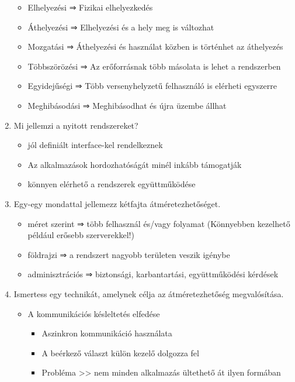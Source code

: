 \documentclass[twoside, a4paper, 12pt]{article}
\begin{document}
\begin{enumerate}
\begin{itemize}
            \item Elhelyezési ⇒ Fizikai elhelyezkedés
            \item Áthelyezési ⇒ Elhelyezési és a hely meg is változhat
            \item Mozgatási ⇒ Áthelyezési és használat közben is történhet az áthelyezés
            \item Többszörözési ⇒ Az erőforrásnak több másolata is lehet a rendszerben
            \item Egyidejűségi ⇒ Több versenyhelyzetű felhasználó is elérheti egyszerre
            \item Meghibásodási ⇒ Meghibásodhat és újra üzembe állhat
        \end{itemize}
    \item Mi jellemzi a nyitott rendszereket?
        \begin{itemize}
            \item jól definiált interface-kel rendelkeznek 
            \item Az alkalmazások hordozhatóságát minél inkább támogatják
            \item könnyen elérhető a rendszerek együttműködése
        \end{itemize}
    \item Egy-egy mondattal jellemezz kétfajta átméretezhetőséget.
        \begin{itemize}
            \item méret szerint   ⇒ több felhasznál és/vagy folyamat  (Könnyebben
                kezelhető például erősebb szerverekkel!)
            \item földrajzi       ⇒ a rendszert nagyobb területen veszik igénybe
            \item adminisztrációs ⇒ biztonsági, karbantartási, együttműködési kérdések
        \end{itemize}
    \item Ismertess egy technikát, amelynek célja az átméretezhetőség megvalósítása.
        \begin{itemize}
            \item A kommunikációs késleltetés elfedése
                \begin{itemize}
                    \item Aszinkron kommunikáció használata
                    \item A beérkező választ külön kezelő dolgozza fel
                    \item Probléma >> nem minden alkalmazás ültethető át ilyen formában

\end{itemize}
\end{itemize}
\end{enumerate}
\end{document}
